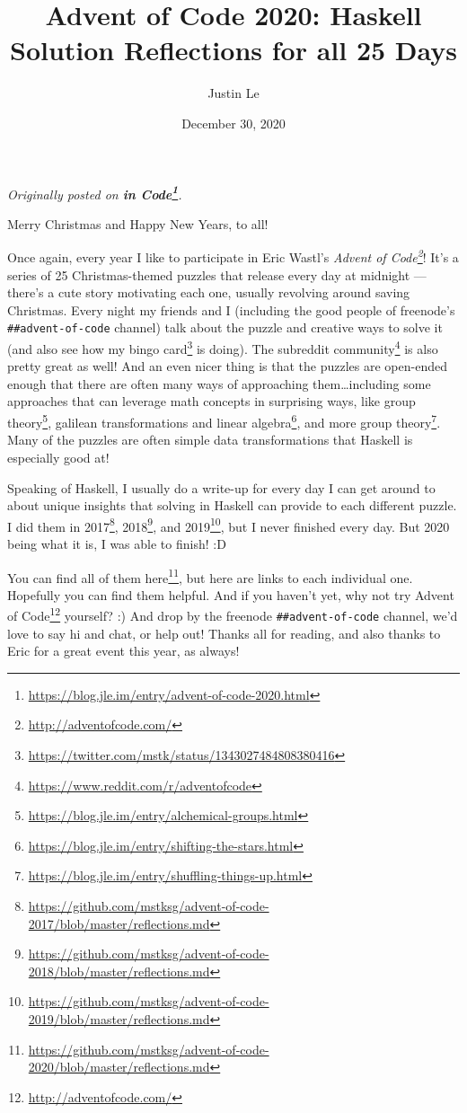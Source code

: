 \documentclass[]{article}
\title{Advent of Code 2020: Haskell Solution Reflections for all 25 Days}
\author{Justin Le}
\date{December 30, 2020}
\renewcommand{\href}[2]{#2\footnote{\url{#1}}}
\begin{document}
\maketitle

\emph{Originally posted on
\textbf{\href{https://blog.jle.im/entry/advent-of-code-2020.html}{in Code}}.}

Merry Christmas and Happy New Years, to all!

Once again, every year I like to participate in Eric Wastl's
\emph{\href{http://adventofcode.com/}{Advent of Code}}! It's a series of 25
Christmas-themed puzzles that release every day at midnight --- there's a cute
story motivating each one, usually revolving around saving Christmas. Every
night my friends and I (including the good people of freenode's
\texttt{\#\#advent-of-code} channel) talk about the puzzle and creative ways to
solve it (and also see how my
\href{https://twitter.com/mstk/status/1343027484808380416}{bingo card} is
doing). The \href{https://www.reddit.com/r/adventofcode}{subreddit community} is
also pretty great as well! And an even nicer thing is that the puzzles are
open-ended enough that there are often many ways of approaching
them\ldots including some approaches that can leverage math concepts in
surprising ways, like
\href{https://blog.jle.im/entry/alchemical-groups.html}{group theory},
\href{https://blog.jle.im/entry/shifting-the-stars.html}{galilean
transformations and linear algebra}, and
\href{https://blog.jle.im/entry/shuffling-things-up.html}{more group theory}.
Many of the puzzles are often simple data transformations that Haskell is
especially good at!

Speaking of Haskell, I usually do a write-up for every day I can get around to
about unique insights that solving in Haskell can provide to each different
puzzle. I did them in
\href{https://github.com/mstksg/advent-of-code-2017/blob/master/reflections.md}{2017},
\href{https://github.com/mstksg/advent-of-code-2018/blob/master/reflections.md}{2018},
and
\href{https://github.com/mstksg/advent-of-code-2019/blob/master/reflections.md}{2019},
but I never finished every day. But 2020 being what it is, I was able to finish!
:D

You can find
\href{https://github.com/mstksg/advent-of-code-2020/blob/master/reflections.md}{all
of them here}, but here are links to each individual one. Hopefully you can find
them helpful. And if you haven't yet, why not try
\href{http://adventofcode.com/}{Advent of Code} yourself? :) And drop by the
freenode \texttt{\#\#advent-of-code} channel, we'd love to say hi and chat, or
help out! Thanks all for reading, and also thanks to Eric for a great event this
year, as always!
\end{document}
